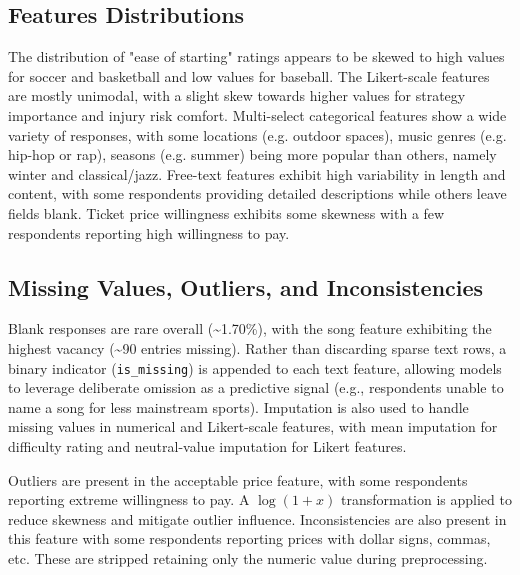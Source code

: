 \documentclass[12pt]{article}
\begin{document}
\subsection*{Features Distributions}
The distribution of "ease of starting" ratings appears to be skewed to high values for soccer and basketball and low values for baseball. The Likert-scale features are mostly unimodal, with a slight skew towards higher values for strategy importance and injury risk comfort. Multi-select categorical features show a wide variety of responses, with some locations (e.g. outdoor spaces), music genres (e.g. hip-hop or rap), seasons (e.g. summer) being more popular than others, namely winter and classical/jazz. Free-text features exhibit high variability in length and content, with some respondents providing detailed descriptions while others leave fields blank. Ticket price willingness exhibits some skewness with a few respondents reporting high willingness to pay.


\subsection*{Missing Values, Outliers, and Inconsistencies}
Blank responses are rare overall (\textasciitilde 1.70\%), with the song feature exhibiting the highest vacancy (\textasciitilde 90 entries missing). Rather than discarding sparse text rows, a binary indicator (\texttt{is\_missing}) is appended to each text feature, allowing models to leverage deliberate omission as a predictive signal (e.g., respondents unable to name a song for less mainstream sports). Imputation is also used to handle missing values in numerical and Likert-scale features, with mean imputation for difficulty rating and neutral-value imputation for Likert features. 

Outliers are present in the acceptable price feature, with some respondents reporting extreme willingness to pay. A $\log(1+x)$ transformation is applied to reduce skewness and mitigate outlier influence. Inconsistencies are also present in this feature with some respondents reporting prices with dollar signs, commas, etc. These are stripped retaining only the numeric value during preprocessing. 
\end{document}
